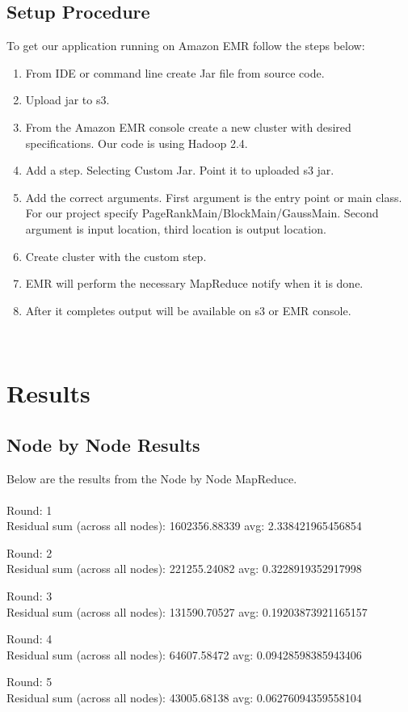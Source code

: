 \documentclass[11pt,letterpaper]{article}
\begin{document}
\subsection{Setup Procedure}
To get our application running on Amazon EMR follow the steps below:
\begin{enumerate}
  \item From IDE or command line create Jar file from source code.
  \item Upload jar to s3.
  \item From the Amazon EMR console create a new cluster with desired specifications. Our code is using Hadoop 2.4. 
  \item Add a step. Selecting Custom Jar. Point it to uploaded s3 jar.
  \item Add the correct arguments. First argument is the entry point or main class. For our project specify PageRankMain/BlockMain/GaussMain. Second argument is input location, third location is output location. 
  \item Create cluster with the custom step.
  \item EMR will perform the necessary MapReduce notify when it is done.
  \item After it completes output will be available on s3 or EMR console. 
\end{enumerate}
\\
\section{Results}
\subsection{Node by Node Results}
Below are the results from the Node by Node MapReduce.\\ \\
Round: 1\\
Residual sum (across all nodes): 1602356.88339 avg: 2.338421965456854

Round: 2\\
Residual sum (across all nodes): 221255.24082 avg: 0.3228919352917998

Round: 3\\
Residual sum (across all nodes): 131590.70527 avg: 0.19203873921165157

Round: 4\\
Residual sum (across all nodes): 64607.58472 avg: 0.09428598385943406

Round: 5\\
Residual sum (across all nodes): 43005.68138 avg: 0.06276094359558104
\\
\end{document}

